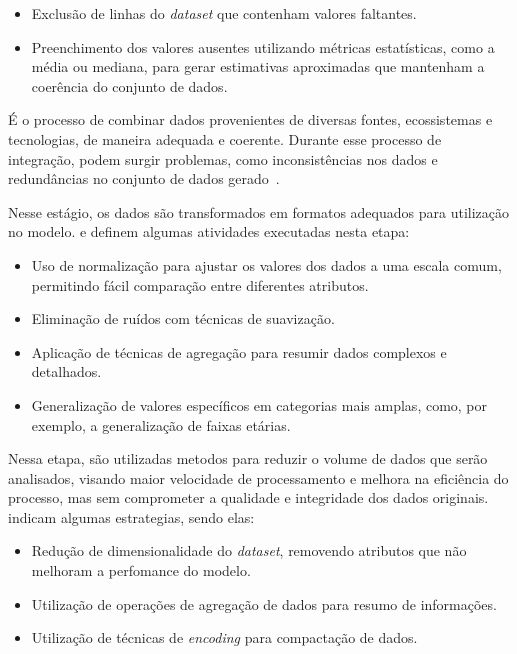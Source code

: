                 \begin{itemize}
                    \item Exclusão de linhas do \emph{dataset} que contenham valores faltantes.
                    \item Preenchimento dos valores ausentes utilizando métricas estatísticas, como a média ou mediana, 
                    para gerar estimativas aproximadas que mantenham a coerência do conjunto de dados.
                \end{itemize}
                
                É o processo de combinar dados provenientes de diversas fontes, ecossistemas e tecnologias, de maneira adequada 
                e coerente. Durante esse processo de integração, podem surgir problemas, como inconsistências nos dados e 
                redundâncias no conjunto de dados gerado~\cite{sivakumar2017, silva2021, oliveira2024}.

                Nesse estágio, os dados são transformados em formatos adequados para utilização no modelo. 
                 e  definem algumas atividades executadas nesta 
                etapa:

                \begin{itemize} 
                    \item Uso de normalização para ajustar os valores dos dados a uma escala comum, permitindo fácil comparação entre 
                    diferentes atributos. 
                    \item Eliminação de ruídos com técnicas de suavização. 
                    \item Aplicação de técnicas de agregação para resumir dados complexos e detalhados. 
                    \item Generalização de valores específicos em categorias mais amplas, como, por exemplo, a generalização de 
                    faixas etárias. 
                \end{itemize}

                Nessa etapa, são utilizadas metodos para reduzir o volume de dados que serão analisados, visando maior velocidade
                de processamento e melhora na eficiência do processo, mas sem comprometer a qualidade e integridade dos dados 
                originais.~ indicam algumas estrategias, sendo elas:
                \begin{itemize}
                    \item Redução de dimensionalidade do \emph{dataset}, removendo atributos que não melhoram a perfomance do 
                    modelo.
                    \item Utilização de operações de agregação de dados para resumo de informações.
                    \item Utilização de técnicas de \emph{encoding} para compactação de dados.
                \end{itemize}


